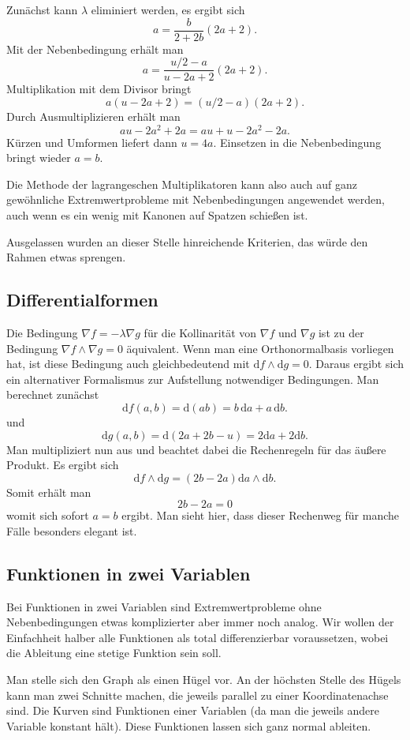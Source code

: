 \documentclass[a4paper,11pt,fleqn,twocolumn,twoside,dvipdfmx]{scrartcl}
\begin{document}
Zunächst kann $\lambda$ eliminiert werden, es ergibt sich
\[a=\frac{b}{2+2b}(2a+2).\]
Mit der Nebenbedingung erhält man
\[a=\frac{u/2-a}{u-2a+2}(2a+2).\]
Multiplikation mit dem Divisor bringt
\[a(u-2a+2)=(u/2-a)(2a+2).\]
Durch Ausmultiplizieren erhält man
\[au-2a^2+2a = au+u-2a^2-2a.\]
Kürzen und Umformen liefert dann $u=4a$. Einsetzen
in die Nebenbedingung bringt wieder $a=b$.

Die Methode der lagrangeschen Multiplikatoren kann also auch auf
ganz gewöhnliche Extremwertprobleme mit Nebenbedingungen angewendet
werden, auch wenn es ein wenig mit Kanonen auf Spatzen schießen ist.

Ausgelassen wurden an dieser Stelle hinreichende Kriterien,
das würde den Rahmen etwas sprengen.

\subsection*{Differentialformen}

Die Bedingung $\nabla f=-\lambda\nabla g$ für die Kollinarität von $\nabla f$ und $\nabla g$ ist zu der Bedingung $\nabla f\wedge\nabla g=0$ äquivalent. Wenn man eine Orthonormalbasis vorliegen hat, ist diese Bedingung auch gleichbedeutend mit $\mathrm df\wedge\mathrm dg=0$.
Daraus ergibt sich ein alternativer Formalismus
zur Aufstellung notwendiger Bedingungen. Man berechnet zunächst
\[\mathrm df(a,b) = \mathrm d(ab) = b\,\mathrm da+a\,\mathrm db.\]
und
\[\mathrm dg(a,b) = \mathrm d(2a+2b-u) = 2\mathrm da+2\mathrm db.\]
Man multipliziert nun aus und beachtet dabei die Rechenregeln
für das äußere Produkt. Es ergibt sich
\[\mathrm df\wedge\mathrm dg
= (2b-2a)\mathrm da\wedge\mathrm db.\]
Somit erhält man
\[2b-2a=0\]
womit sich sofort $a=b$ ergibt. Man sieht hier, dass dieser Rechenweg für manche Fälle besonders elegant ist.

\subsection*{Funktionen in zwei Variablen}

Bei Funktionen in zwei Variablen sind Extremwertprobleme ohne
Nebenbedingungen etwas komplizierter aber immer noch analog.
Wir wollen der Einfachheit halber alle Funktionen als
total differenzierbar voraussetzen, wobei die Ableitung
eine stetige Funktion sein soll.

Man stelle sich den Graph
als einen Hügel vor. An der höchsten Stelle des Hügels kann man
zwei Schnitte machen, die jeweils parallel zu einer Koordinatenachse
sind. Die Kurven sind Funktionen einer Variablen (da man
die jeweils andere Variable konstant hält). Diese Funktionen lassen
sich ganz normal ableiten.
\end{document}
